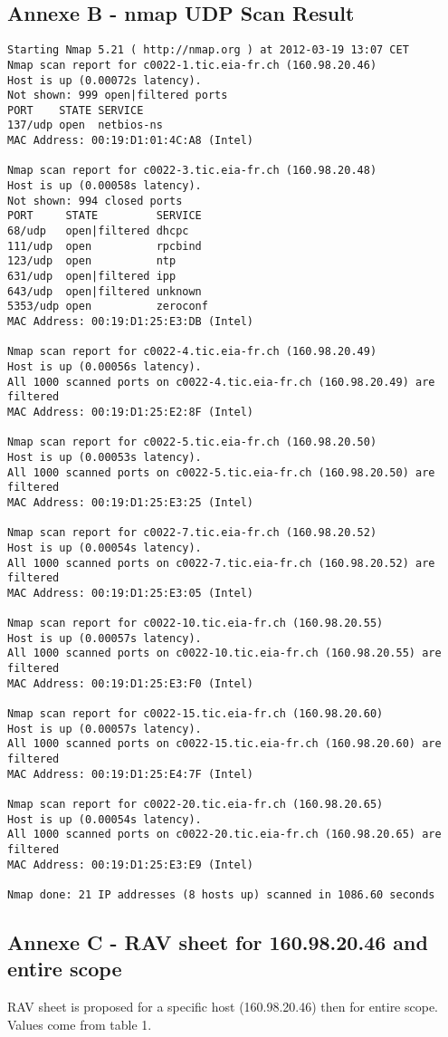 \documentclass[10pt,a4paper,twoside,onecolumn]{article}
\begin{document}
\subsection{Annexe B - nmap UDP Scan Result}

\begin{lstlisting}
Starting Nmap 5.21 ( http://nmap.org ) at 2012-03-19 13:07 CET
Nmap scan report for c0022-1.tic.eia-fr.ch (160.98.20.46)
Host is up (0.00072s latency).
Not shown: 999 open|filtered ports
PORT    STATE SERVICE
137/udp open  netbios-ns
MAC Address: 00:19:D1:01:4C:A8 (Intel)

Nmap scan report for c0022-3.tic.eia-fr.ch (160.98.20.48)
Host is up (0.00058s latency).
Not shown: 994 closed ports
PORT     STATE         SERVICE
68/udp   open|filtered dhcpc
111/udp  open          rpcbind
123/udp  open          ntp
631/udp  open|filtered ipp
643/udp  open|filtered unknown
5353/udp open          zeroconf
MAC Address: 00:19:D1:25:E3:DB (Intel)

Nmap scan report for c0022-4.tic.eia-fr.ch (160.98.20.49)
Host is up (0.00056s latency).
All 1000 scanned ports on c0022-4.tic.eia-fr.ch (160.98.20.49) are filtered
MAC Address: 00:19:D1:25:E2:8F (Intel)

Nmap scan report for c0022-5.tic.eia-fr.ch (160.98.20.50)
Host is up (0.00053s latency).
All 1000 scanned ports on c0022-5.tic.eia-fr.ch (160.98.20.50) are filtered
MAC Address: 00:19:D1:25:E3:25 (Intel)

Nmap scan report for c0022-7.tic.eia-fr.ch (160.98.20.52)
Host is up (0.00054s latency).
All 1000 scanned ports on c0022-7.tic.eia-fr.ch (160.98.20.52) are filtered
MAC Address: 00:19:D1:25:E3:05 (Intel)

Nmap scan report for c0022-10.tic.eia-fr.ch (160.98.20.55)
Host is up (0.00057s latency).
All 1000 scanned ports on c0022-10.tic.eia-fr.ch (160.98.20.55) are filtered
MAC Address: 00:19:D1:25:E3:F0 (Intel)

Nmap scan report for c0022-15.tic.eia-fr.ch (160.98.20.60)
Host is up (0.00057s latency).
All 1000 scanned ports on c0022-15.tic.eia-fr.ch (160.98.20.60) are filtered
MAC Address: 00:19:D1:25:E4:7F (Intel)

Nmap scan report for c0022-20.tic.eia-fr.ch (160.98.20.65)
Host is up (0.00054s latency).
All 1000 scanned ports on c0022-20.tic.eia-fr.ch (160.98.20.65) are filtered
MAC Address: 00:19:D1:25:E3:E9 (Intel)

Nmap done: 21 IP addresses (8 hosts up) scanned in 1086.60 seconds
\end{lstlisting}

\subsection{Annexe C - RAV sheet for 160.98.20.46 and entire scope}

RAV sheet is proposed for a specific host (160.98.20.46) then for entire scope. Values come from table 1.




\end{document}
